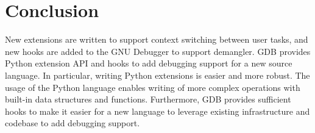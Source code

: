 \chapter{Conclusion}
New extensions are written to support context switching between \uCCS user tasks, and
new hooks are added to the GNU
Debugger to support \CFAS demangler. GDB provides Python extension API and hooks to add debugging support for a
new source language. In particular, writing Python extensions is easier and more
robust. The usage of the Python language enables writing of
more complex operations with built-in data structures and functions.
Furthermore, GDB provides sufficient hooks to make it easier for a new language to leverage existing
infrastructure and codebase to add debugging support.
